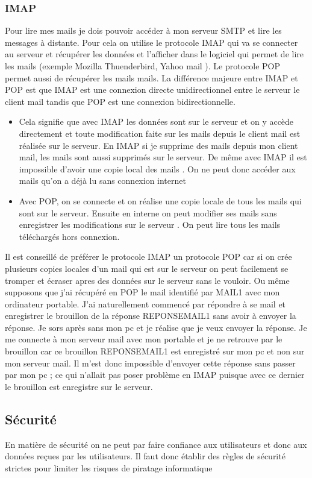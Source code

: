 \documentclass[a4paper,12pt,french]{report} %
\begin{document}
\subsubsection{IMAP}
Pour lire mes mails je dois pouvoir accéder à mon serveur SMTP et lire les messages à distante. Pour cela on utilise le protocole IMAP qui va se connecter au serveur et récupérer les données et l'afficher dans le logiciel qui permet de lire les mails (exemple Mozilla Thuenderbird, Yahoo mail ). Le protocole POP permet aussi de récupérer les mails mails. La différence majeure entre IMAP et POP est que IMAP est une connexion directe unidirectionnel  entre le serveur le client mail tandis que POP est une connexion bidirectionnelle.
\begin{itemize}
\item Cela signifie que avec IMAP les données sont sur le serveur et on y accède directement et toute modification faite sur les mails depuis le client mail est réalisée sur le serveur. En IMAP si je supprime des mails depuis mon client mail, les mails sont aussi supprimés sur le serveur. De même avec IMAP il est impossible d'avoir une copie local des mails . On ne peut donc accéder aux mails qu'on a déjà lu sans connexion internet
\item Avec POP, on se connecte et on réalise une copie locale de tous les mails qui sont sur le serveur. Ensuite en interne on peut modifier ses mails sans enregistrer les modifications sur le serveur . On peut lire tous les mails téléchargés hors connexion.  
\end{itemize} 
	Il est conseillé de préférer le protocole IMAP un protocole POP car si on crée plusieurs copies locales d'un mail qui est sur le serveur on peut facilement se tromper et écraser apres des données sur le serveur sans le vouloir. Ou même supposons que j'ai récupéré en POP le mail identifié par MAIL1 avec mon ordinateur portable. J'ai naturellement commencé par répondre à se mail et enregistrer le brouillon de la réponse REPONSEMAIL1 sans avoir à envoyer la réponse. Je sors après sans mon pc et je réalise que je veux envoyer la réponse. Je me connecte à mon serveur mail avec mon portable et je ne retrouve par le brouillon car ce brouillon  REPONSEMAIL1 est enregistré sur mon pc et non sur mon serveur mail. Il m'est donc impossible d'envoyer cette réponse sans passer par mon pc ; ce qui n'allait  pas poser problème en IMAP puisque avec ce dernier le brouillon est enregistre sur le serveur.
	
\subsection{Sécurité}
En matière de sécurité on ne peut par faire confiance aux utilisateurs et donc aux données reçues par les utilisateurs. Il faut donc établir des règles de sécurité strictes pour limiter les risques de piratage informatique 
\end{document}
